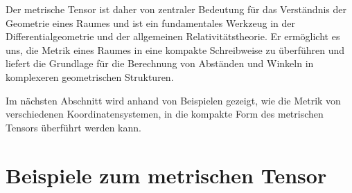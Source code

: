 Der metrische Tensor ist daher von zentraler Bedeutung für das Verständnis der Geometrie eines Raumes und ist ein fundamentales Werkzeug in der Differentialgeometrie und der allgemeinen Relativitätstheorie. 
Er ermöglicht es uns, die Metrik eines Raumes in eine kompakte Schreibweise zu überführen und liefert die Grundlage für die Berechnung von Abständen und Winkeln in komplexeren geometrischen Strukturen.

Im nächsten Abschnitt wird anhand von Beispielen gezeigt, wie die Metrik von verschiedenen Koordinatensystemen, in die kompakte Form des metrischen Tensors überführt werden kann.

\section{Beispiele zum metrischen Tensor}




